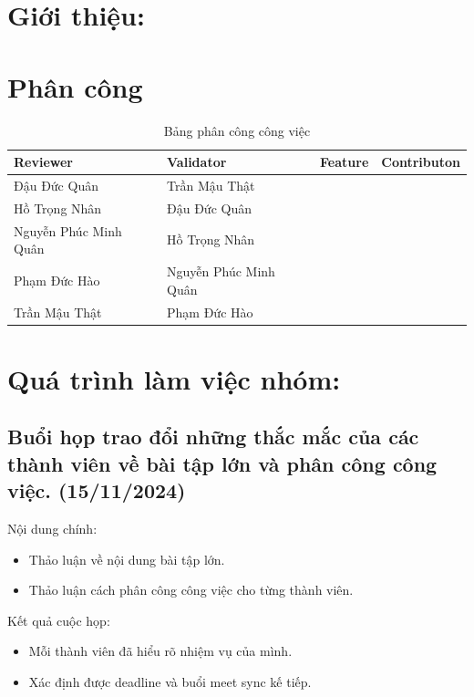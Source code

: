 \documentclass[a4paper, 12pt]{article}
\begin{document}
\newpage
\tableofcontents
\newpage
\section{Giới thiệu:}

\section{Phân công}
 \begin{table}[H]
\centering
\begin{tabular}{|p{3cm}|p{3cm}|l|c|}
\hline 
Reviewer &
Validator &
  \multicolumn{1}{c|}{Feature} &Contributon \\ \hline
Đậu Đức Quân & Trần Mậu Thật &&\\\hline
Hồ Trọng Nhân & Đậu Đức Quân &&\\ \hline
Nguyễn Phúc Minh Quân & Hồ Trọng Nhân &&\\ \hline
Phạm Đức Hào & Nguyễn Phúc Minh Quân &&\\ \hline
Trần Mậu Thật & Phạm Đức Hào &&\\ \hline
\end{tabular}
\caption{Bảng phân công công việc}
\label{tab:my-table}
\end{table}





\newpage
\section{Quá trình làm việc nhóm:}
\subsection{Buổi họp trao đổi những thắc mắc của các thành viên về bài tập lớn và phân công công việc. (15/11/2024)}
Nội dung chính:
\begin{itemize}
    \item Thảo luận về nội dung bài tập lớn.
    \item Thảo luận cách phân công công việc cho từng thành viên.
\end{itemize}
Kết quả cuộc họp:
\begin{itemize}
  \item Mỗi thành viên đã hiểu rõ nhiệm vụ của mình.
  \item Xác định được deadline và buổi meet sync kế tiếp.
\end{itemize}
\end{document}

